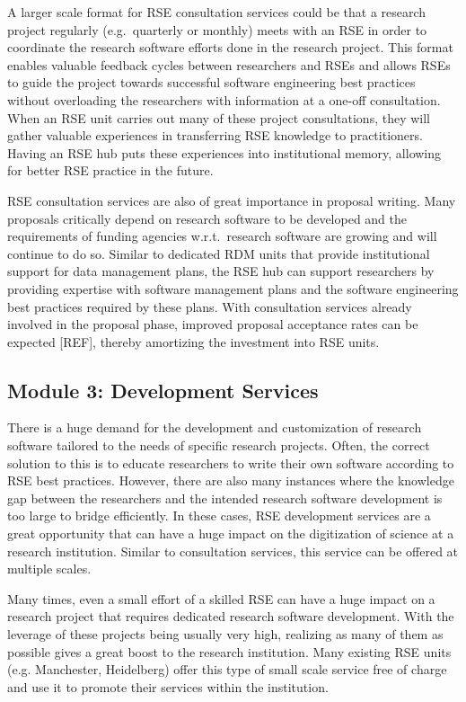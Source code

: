 \documentclass[a4paper]{article}
\makeatletter
\newcommand*{\eg}{e.g.\@\xspace}
\makeatother
\begin{document}
A larger scale format for RSE consultation services could be that a research project regularly (e.g.\ quarterly or monthly) meets with an RSE in order to coordinate the research software efforts done in the research project.
This format enables valuable feedback cycles between researchers and RSEs and allows RSEs to guide the project
towards successful software engineering best practices without overloading the researchers with information at a one-off consultation.
When an RSE unit carries out many of these project consultations, they will gather valuable experiences in transferring RSE knowledge to practitioners.
Having an RSE hub puts these experiences into institutional memory, allowing for better RSE practice in the future.

RSE consultation services are also of great importance in proposal writing.
Many proposals critically depend on research software to be developed and the requirements of funding agencies w.r.t.\ research software are growing and will continue to do so.
Similar to dedicated RDM units that provide institutional support for data management plans,
the RSE hub can support researchers by providing expertise with software management plans and the software engineering best practices required by these plans.
With consultation services already involved in the proposal phase, improved proposal acceptance rates can be expected [REF], thereby amortizing the investment into RSE units.


\subsection{Module 3: Development Services}%
\label{sec:development}

There is a huge demand for the development and customization of research software tailored to the needs of specific research projects.
Often, the correct solution to this is to educate researchers to write their own software according to RSE best practices.
However, there are also many instances where the knowledge gap between the researchers and the intended research software development is too large to bridge efficiently.
In these cases, RSE development services are a great opportunity that can have a huge impact on the digitization of science at a research institution.
Similar to consultation services, this service can be offered at multiple scales.

Many times, even a small effort of a skilled RSE can have a huge impact on a research project that requires dedicated research software development.
With the leverage of these projects being usually very high, realizing as many of them as possible gives a great boost to the research institution.
Many existing RSE units (\eg{} Manchester, Heidelberg) offer this type of small scale service free of charge and use it to promote their services within the institution.
\end{document}
